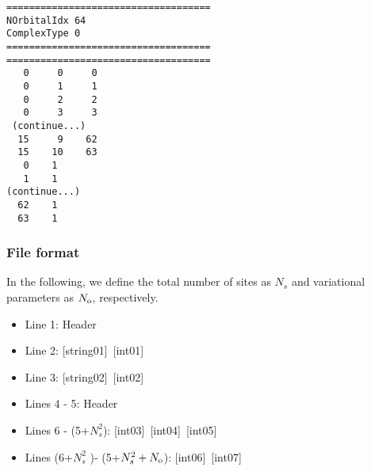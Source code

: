 \begin{minipage}{12.5cm}
\begin{screen}
\begin{verbatim}
====================================
NOrbitalIdx 64   
ComplexType 0
====================================
====================================
   0     0     0 
   0     1     1 
   0     2     2 
   0     3     3 
 (continue...)
  15     9    62 
  15    10    63 
   0    1 
   1    1 
(continue...)
  62    1 
  63    1 
\end{verbatim}
\end{screen}
\end{minipage}

\subsubsection{File format}
In the following, we define the total number of sites as $N_s$ and variational parameters as $N_{\rm o}$, respectively.  

 \begin{itemize}
   \item  Line 1: Header
   \item  Line 2: [string01]~[int01]
   \item  Line 3: [string02]~[int02]
   \item  Lines 4 - 5:  Header
   \item  Lines 6 - (5+$N_s^2$): [int03]~[int04]~[int05]
   \item  Lines (6+$N_s^2$ )- (5+$N_s^2+N_{\rm o}$): [int06]~[int07]
  \end{itemize}

